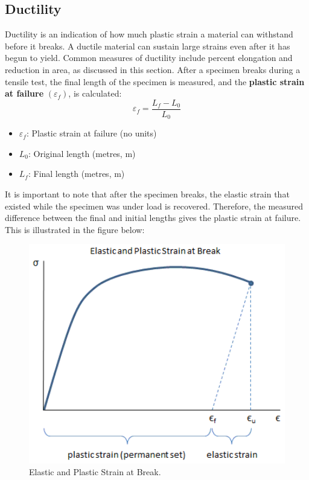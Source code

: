 \documentclass{article}
\begin{document}
\subsection{Ductility}
Ductility is an indication of how much plastic strain a material can withstand before it breaks. A ductile material can sustain large strains even after it has begun to yield. Common measures of ductility include percent elongation and reduction in area, as discussed in this section.
After a specimen breaks during a tensile test, the final length of the specimen is measured, and the \textbf{plastic strain at failure} $(\varepsilon_f)$, is calculated:
\begin{equation}
    \varepsilon_f = \frac{L_f - L_0}{L_0}
\end{equation}
\begin{itemize}[itemsep=-1mm]
    \item $\varepsilon_f$: Plastic strain at failure (no units)
    \item $L_0$: Original length (metres, m)
    \item $L_f$: Final length (metres, m)
\end{itemize}
It is important to note that after the specimen breaks, the elastic strain that existed while the specimen was under load is recovered. Therefore, the measured difference between the final and initial lengths gives the plastic strain at failure. This is illustrated in the figure below:\\[8pt]
\begin{minipage}{0.45\textwidth}\centering
    \begin{figure}[H]
    \centering
    \includegraphics[width=1.1\textwidth]{images/elastic-plastic-strain-at-break-01.png}
    \caption{Elastic and Plastic Strain at Break.}
    \label{fig:strain-break}
\end{figure}
\end{minipage}\hfill
\end{document}

